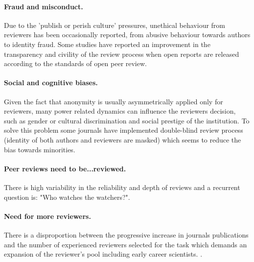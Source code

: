 \documentclass[runningheads]{llncs}
\begin{document}
\paragraph{Fraud and misconduct.} Due to the 'publish or perish culture' pressures, unethical behaviour from reviewers has been occasionally reported, from abusive behaviour towards authors \cite{Smith2006,tragedy-reviewers} to identity fraud. Some studies have reported an improvement in the transparency and civility of the review process when open reports are released according to the standards of open peer review.
\paragraph{Social and cognitive biases.} Given the fact that anonymity is usually asymmetrically applied only for reviewers, many power related dynamics can influence the reviewers decision, such as gender or cultural discrimination and social prestige of the institution. To solve this problem some journals have implemented double-blind review process (identity of both authors and reviewers are masked) which seems to reduce the bias towards minorities.
\paragraph{Peer reviews need to be...reviewed.} There is high variability in the reliability and depth of reviews and a recurrent question is: "Who watches the watchers?".
\paragraph{Need for more reviewers.} There is a disproportion between the progressive increase in journals publications and the number of experienced reviewers selected for the task which demands an expansion of the reviewer's pool including early career scientists. \cite{tragedy-reviewers}.
\end{document}
